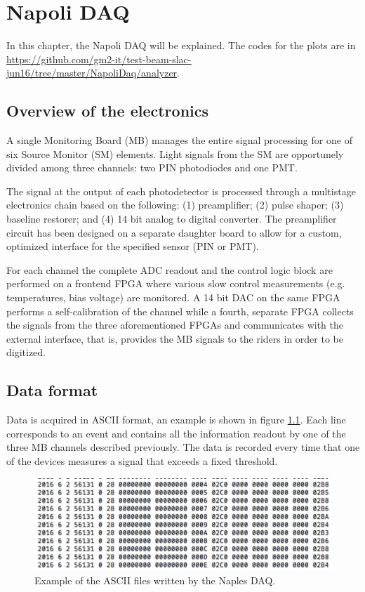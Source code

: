 \chapter{Napoli DAQ}
\label{chap:napolidaq}

In this chapter, the Napoli DAQ will be explained. The codes for the plots are in \url{https://github.com/gm2-it/test-beam-slac-jun16/tree/master/NapoliDaq/analyzer}.

\section{Overview of the electronics}
A single Monitoring Board (MB) manages the entire signal processing for one of six Source Monitor (SM) elements. Light signals from the SM are opportunely divided among three channels: two PIN photodiodes and one PMT. 

The signal at the output of each photodetector is processed through a multistage electronics chain based on the following: (1) preamplifier; (2) pulse shaper; (3) baseline restorer; and (4) 14 bit analog to digital converter. The preamplifier circuit has been designed on a separate daughter board to allow for a custom, optimized interface for the specified sensor (PIN or PMT). 

For each channel the complete ADC readout and the control logic block are performed on a frontend FPGA where various slow control measurements (e.g. temperatures, bias voltage) are monitored. A 14 bit DAC on the same FPGA performs a self-calibration of the channel while a fourth, separate FPGA collects the signals from the three aforementioned FPGAs and communicates with the external interface, that is, provides the MB signals to the riders in order to be digitized.

\section{Data format}

Data is acquired in ASCII format, an example is shown in figure \ref{ASCII}.  Each line corresponds to an event and contains all the information readout by one of the three MB channels described previously. The data is recorded every time that one of the devices measures a signal that exceeds a fixed threshold. \\

\begin{figure}
\begin{center}
\includegraphics[width=\textwidth]{pics/NaDAQ.pdf}
\caption{Example of the ASCII files written by the Naples DAQ.}
\label{ASCII}
\end{center}
\end{figure}


